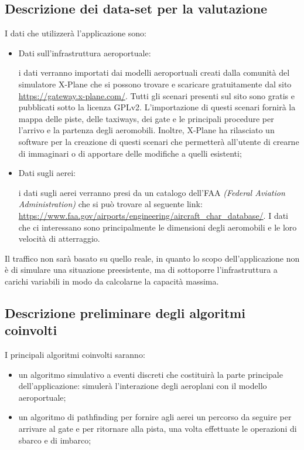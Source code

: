 \documentclass[a4paper, 12pt]{article}
\begin{document}
	\subsection{Descrizione dei data-set per la valutazione}
	
	I dati che utilizzerà l'applicazione sono:
	
	\begin{itemize}
	
		\item Dati sull'infrastruttura aeroportuale:
		
			i dati verranno importati dai modelli aeroportuali creati dalla comunità del simulatore X-Plane che si possono trovare e scaricare gratuitamente dal sito \url{https://gateway.x-plane.com/}. Tutti gli scenari presenti sul sito sono gratis e pubblicati sotto la licenza GPLv2. L'importazione di questi scenari fornirà la mappa delle piste, delle taxiways, dei gate e le principali procedure per l'arrivo e la partenza degli aeromobili.
		Inoltre, X-Plane ha rilasciato un software per la creazione di questi scenari che permetterà all'utente di crearne di immaginari o di apportare delle modifiche a quelli esistenti;
		\newpage
		\item Dati sugli aerei:
		
			i dati sugli aerei verranno presi da un catalogo dell'FAA \textit{(Federal Aviation Administration)} che si può trovare al seguente link: \url{https://www.faa.gov/airports/engineering/aircraft_char_database/}. I dati che ci interessano sono principalmente le dimensioni degli aeromobili e le loro velocità di atterraggio.
	
	\end{itemize}
	
	Il traffico non sarà basato su quello reale, in quanto lo scopo dell'applicazione non è di simulare una situazione preesistente, ma di sottoporre l'infrastruttura a carichi variabili in modo da calcolarne la capacità massima.

	\subsection{Descrizione preliminare degli algoritmi coinvolti}
	
	I principali algoritmi coinvolti saranno:
	
	\begin{itemize}
	
		\item un algoritmo simulativo a eventi discreti che costituirà la parte principale dell'applicazione: simulerà l'interazione degli aeroplani con il modello aeroportuale;
		
		\item un algoritmo di pathfinding per fornire agli aerei un percorso da seguire per arrivare al gate e per ritornare alla pista, una volta effettuate le operazioni di sbarco e di imbarco;
	
	\end{itemize}
	
\end{document}
